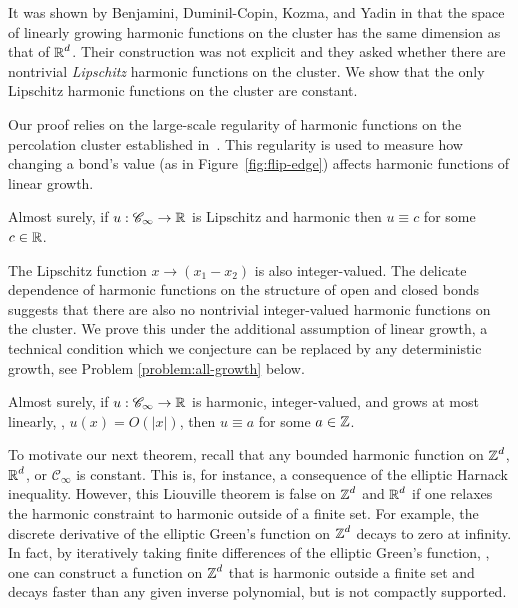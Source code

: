 \documentclass[12pt]{amsart}
\numberwithin{equation}{section}
\begin{document}
	It was shown by Benjamini, Duminil-Copin, Kozma, and Yadin in \cite{disorder-entropy-2015} that the space of linearly growing harmonic functions on the cluster has the same dimension as that of $\operatorname{\mathbb{R}}^d$. Their construction was not explicit and they asked \cite{disorder-entropy-2015-question} whether there are nontrivial {\it Lipschitz} harmonic functions on the cluster.  We show that the only Lipschitz harmonic functions on the cluster are constant. 
	
	Our proof relies on the large-scale regularity of harmonic functions on the percolation cluster established in~\cite{armstrong-dario-2018}. This regularity is used to measure how changing a bond's value (as in Figure~\ref{fig:flip-edge}) affects harmonic functions of linear growth.
	\begin{theorem} \label{theorem:lipschitz}
		Almost surely, if $u: \mathscr{C}_{\infty} \to \operatorname{\mathbb{R}}$ is Lipschitz and harmonic then 
		$u \equiv c$ for some $c \in \operatorname{\mathbb{R}}$. 
	\end{theorem}
	
	The Lipschitz function $x \to (x_1 - x_2)$ is also integer-valued. The delicate dependence of harmonic functions on the structure of open and closed bonds suggests that there are also no nontrivial integer-valued harmonic functions 
	on the cluster. We prove this under the additional assumption of linear growth, a technical condition which we conjecture can be replaced by any deterministic growth, see Problem \ref{problem:all-growth} below.
	\begin{theorem} \label{theorem:integer-valued-linear-growth}
		Almost surely, if $u: \mathscr{C}_{\infty} \to \operatorname{\mathbb{R}}$ is harmonic, integer-valued, and grows at most linearly, \ie,
		$u(x) = O(|x|)$,  then $u \equiv a$ for some $a \in \operatorname{\mathbb{Z}}$. 
	\end{theorem}
	
	
	To motivate our next theorem, recall that any bounded harmonic function on $\operatorname{\mathbb{Z}}^d$, $\operatorname{\mathbb{R}}^d$, or $\mathscr{C}_{\infty}$ is constant. This is, for instance, a consequence 
	of the elliptic Harnack inequality. However, this Liouville theorem is false on $\operatorname{\mathbb{Z}}^d$ and $\operatorname{\mathbb{R}}^d$ if one relaxes the harmonic constraint 
	to harmonic outside of a finite set. For example, the discrete derivative of the elliptic Green's function on $\operatorname{\mathbb{Z}}^d$ decays to zero at infinity. 
	In fact, by iteratively taking finite differences of the elliptic Green's function,  \cite{schmidt-verbitskiy-2009,sandpiles-square-lattice}, 
	one can construct a function on $\operatorname{\mathbb{Z}}^d$ that is harmonic outside a finite set and decays faster than any given inverse polynomial,
	but is not compactly supported. 
	
\end{document}
